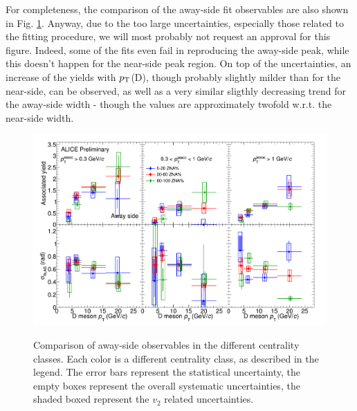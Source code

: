 For completeness, the comparison of the away-side fit observables are also shown in Fig. \ref{fig:prel3}. Anyway, due to the too large uncertainties, especially those related to the fitting procedure, we will most probably not request an approval for this figure. Indeed, some of the fits even fail in reproducing the away-side peak, while this doesn't happen for the near-side peak region. On top of the uncertainties, an increase of the yields with $p_{\rm T}$(D), though probably slightly milder than for the near-side, can be observed, as well as a very similar sligthly decreasing trend for the away-side width - though the values are approximately twofold w.r.t. the near-side width.

\begin{landscape}
\begin{figure}
\centering
{\includegraphics[width=0.95\linewidth]{figuresVsCent/Averages/Trends/ComparePPbVsCentFitResults_AwaySide_FinalQM.png}}
 \caption{Comparison of away-side observables in the different centrality classes. Each color is a different centrality class, as described in the legend. The error bars represent the statistical uncertainty, the empty boxes represent the overall systematic uncertainties, the shaded boxed represent the $v_2$ related uncertainties.}
\label{fig:prel3}
\end{figure}
 \end{landscape} 
